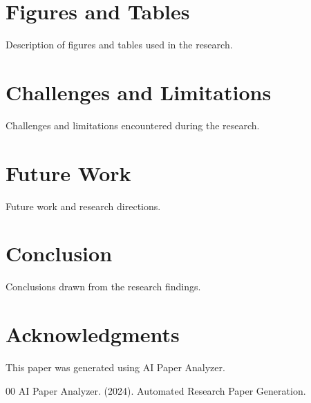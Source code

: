 \documentclass[conference]{IEEEtran}
\begin{document}
\section{Figures and Tables}
Description of figures and tables used in the research.

\section{Challenges and Limitations}
Challenges and limitations encountered during the research.

\section{Future Work}
Future work and research directions.

\section{Conclusion}
Conclusions drawn from the research findings.

\section*{Acknowledgments}
This paper was generated using AI Paper Analyzer.

\begin{thebibliography}{00}
 AI Paper Analyzer. (2024). Automated Research Paper Generation.
\end{thebibliography}
\end{document}
